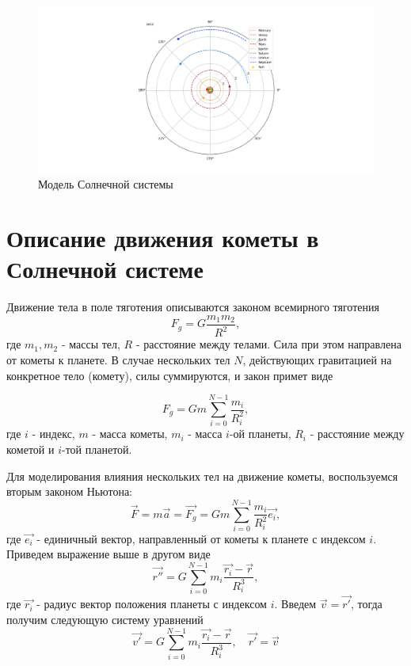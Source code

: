 \begin{figure}[h!]
	\centering
	\includegraphics[width=0.8\linewidth]{imgs_8/solar.png}
	\caption{Модель Солнечной системы}
    \label{fig:system}
\end{figure}


\section{Описание движения кометы в Солнечной системе}
Движение тела в поле тяготения описываются законом всемирного тяготения
\begin{equation}
	F_g = G\frac{m_1 m_2}{R^2},
\end{equation}
где $m_1, m_2$ - массы тел, $R$ - расстояние между телами. Сила при этом направлена от кометы к планете.
В случае нескольких тел $N$, действующих
гравитацией на конкретное тело (комету), силы суммируются, и закон примет виде

\begin{equation}
	F_g = G m \sum_{i=0}^{N-1}\frac{m_i}{R_i^2},
\end{equation}
где $i$ - индекс, $m$ - масса кометы, $m_i$ - масса $i$-ой планеты, $R_i$ - расстояние между
кометой и $i$-той планетой.

Для моделирования влияния нескольких тел на движение кометы, воспользуемся вторым законом Ньютона:
\begin{equation}
	\vec{F} = m\vec{a} = \vec{F_g} = G m \sum_{i=0}^{N-1}\frac{m_i}{R_i^2}\vec{e_i},
\end{equation}
где $\vec{e_i}$ - единичный вектор, направленный от кометы к планете с индексом $i$.
Приведем выражение выше в другом виде
\begin{equation}
    \vec{r''} = G \sum_{i=0}^{N-1}m_i\frac{\vec{r_i}-\vec{r}}{R_i^3},
\end{equation}
где $\vec{r_i}$ - радиус вектор положения планеты с индексом $i$. Введем $\vec{v} = \vec{r'}$,
тогда получим следующую систему уравнений
\begin{equation}
	\vec{v'} = G \sum_{i=0}^{N-1}m_i\frac{\vec{r_i}-\vec{r}}{R_i^3}, \quad
	\vec{r'} = \vec{v}
\end{equation}

